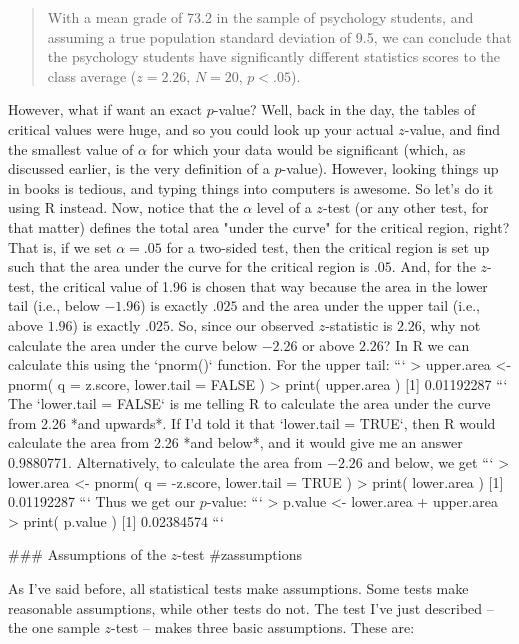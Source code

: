 \begin{quote}
With a mean grade of 73.2 in the sample of psychology students, and assuming a true population standard deviation of 9.5, we can conclude that the psychology students have significantly different statistics scores to the class average ($z = 2.26$, $N=20$, $p<.05$). 
\end{quote}
However, what if want an exact $p$-value? Well, back in the day, the tables of critical values were huge, and so you could look up your actual $z$-value, and find the smallest value of $\alpha$ for which your data would be significant (which, as discussed earlier, is the very definition of a $p$-value). However, looking things up in books is tedious, and typing things into computers is awesome. So let's do it using R instead. Now, notice that the $\alpha$ level of a $z$-test (or any other test, for that matter) defines the total area "under the curve" for the critical region, right? That is, if we set $\alpha = .05$ for a two-sided test, then the critical region is set up such that the area under the curve for the critical region is $.05$. And, for the $z$-test, the critical value of 1.96 is chosen that way because the area in the lower tail (i.e., below $-1.96$) is exactly $.025$ and the area under the upper tail (i.e., above $1.96$) is exactly $.025$. So, since our observed $z$-statistic is $2.26$, why not calculate the area under the curve below $-2.26$ or above $2.26$? In R we can calculate this using the `pnorm()` function. For the upper tail:
```
> upper.area <- pnorm( q = z.score, lower.tail = FALSE )
> print( upper.area )
[1] 0.01192287
``` 
The `lower.tail = FALSE`  is me telling R to calculate the area under the curve from 2.26 *and upwards*. If I'd told it that `lower.tail = TRUE`, then R would calculate the area from 2.26 *and below*, and it would give me an answer 0.9880771. Alternatively, to calculate the area from $-2.26$ and below, we get
```
> lower.area <- pnorm( q = -z.score, lower.tail = TRUE )
> print( lower.area )
[1] 0.01192287
``` 
Thus we get our $p$-value:
```
> p.value <- lower.area + upper.area
> print( p.value )
[1] 0.02384574
```

 
### Assumptions of the $z$-test {#zassumptions}

As I've said before, all statistical tests make assumptions. Some tests make reasonable assumptions, while other tests do not. The test I've just described -- the one sample $z$-test -- makes three basic assumptions.  These are:

